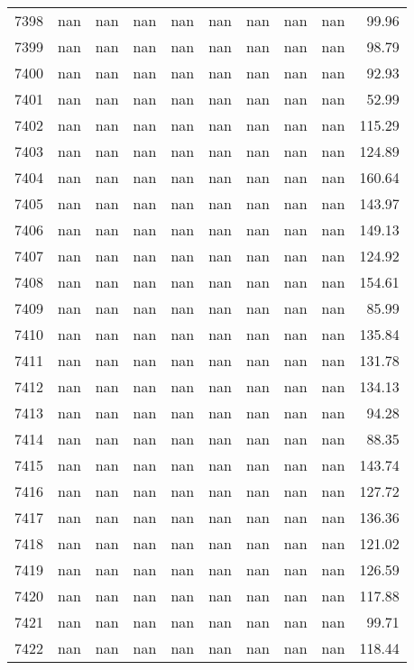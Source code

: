 \begin{tabular}{lrrrrrrrrr}
7398 & nan & nan & nan & nan & nan & nan & nan & nan & 99.96 \\
7399 & nan & nan & nan & nan & nan & nan & nan & nan & 98.79 \\
7400 & nan & nan & nan & nan & nan & nan & nan & nan & 92.93 \\
7401 & nan & nan & nan & nan & nan & nan & nan & nan & 52.99 \\
7402 & nan & nan & nan & nan & nan & nan & nan & nan & 115.29 \\
7403 & nan & nan & nan & nan & nan & nan & nan & nan & 124.89 \\
7404 & nan & nan & nan & nan & nan & nan & nan & nan & 160.64 \\
7405 & nan & nan & nan & nan & nan & nan & nan & nan & 143.97 \\
7406 & nan & nan & nan & nan & nan & nan & nan & nan & 149.13 \\
7407 & nan & nan & nan & nan & nan & nan & nan & nan & 124.92 \\
7408 & nan & nan & nan & nan & nan & nan & nan & nan & 154.61 \\
7409 & nan & nan & nan & nan & nan & nan & nan & nan & 85.99 \\
7410 & nan & nan & nan & nan & nan & nan & nan & nan & 135.84 \\
7411 & nan & nan & nan & nan & nan & nan & nan & nan & 131.78 \\
7412 & nan & nan & nan & nan & nan & nan & nan & nan & 134.13 \\
7413 & nan & nan & nan & nan & nan & nan & nan & nan & 94.28 \\
7414 & nan & nan & nan & nan & nan & nan & nan & nan & 88.35 \\
7415 & nan & nan & nan & nan & nan & nan & nan & nan & 143.74 \\
7416 & nan & nan & nan & nan & nan & nan & nan & nan & 127.72 \\
7417 & nan & nan & nan & nan & nan & nan & nan & nan & 136.36 \\
7418 & nan & nan & nan & nan & nan & nan & nan & nan & 121.02 \\
7419 & nan & nan & nan & nan & nan & nan & nan & nan & 126.59 \\
7420 & nan & nan & nan & nan & nan & nan & nan & nan & 117.88 \\
7421 & nan & nan & nan & nan & nan & nan & nan & nan & 99.71 \\
7422 & nan & nan & nan & nan & nan & nan & nan & nan & 118.44 \\

\end{tabular}
